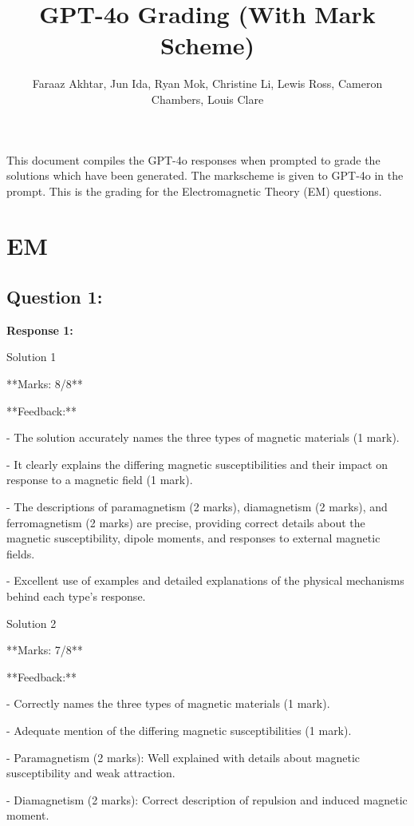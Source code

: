 \documentclass[a4paper,11pt]{article}
\begin{document}
\title{GPT-4o Grading (With Mark Scheme)}
\author{Faraaz Akhtar, Jun Ida, Ryan Mok, Christine Li, Lewis Ross, Cameron Chambers, Louis Clare}
\date{}
\maketitle

This document compiles the GPT-4o responses when prompted to grade the solutions which have been generated. The markscheme is given to GPT-4o in the prompt. This is the grading for the Electromagnetic Theory (EM) questions. 

\section{EM}

\subsection*{Question 1:}

\textbf{Response 1:}

Solution 1

**Marks: 8/8**

**Feedback:**

- The solution accurately names the three types of magnetic materials (1 mark).

- It clearly explains the differing magnetic susceptibilities and their impact on response to a magnetic field (1 mark).

- The descriptions of paramagnetism (2 marks), diamagnetism (2 marks), and ferromagnetism (2 marks) are precise, providing correct details about the magnetic susceptibility, dipole moments, and responses to external magnetic fields.

- Excellent use of examples and detailed explanations of the physical mechanisms behind each type's response.

Solution 2

**Marks: 7/8**

**Feedback:**

- Correctly names the three types of magnetic materials (1 mark).

- Adequate mention of the differing magnetic susceptibilities (1 mark).

- Paramagnetism (2 marks): Well explained with details about magnetic susceptibility and weak attraction.

- Diamagnetism (2 marks): Correct description of repulsion and induced magnetic moment.
\end{document}
